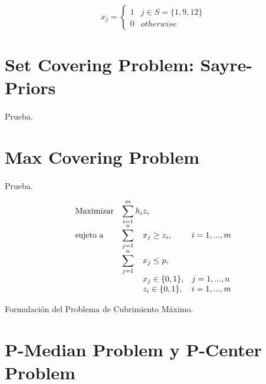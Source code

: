 \documentclass[spanish]{article}
\begin{document}
			\begin{equation}
			\label{eq:sol-2.2}
				x_{j} =
					\begin{cases}
		      	1 & j \in S = \{ 1, 9, 12  \} \\
		      	0 & otherwise
			   	\end{cases}
			\end{equation}


	\section{Set Covering Problem: Sayre-Priors}
	\label{sec:3}

		\paragraph{}
		Prueba.



	\section{Max Covering Problem}
	\label{sec:4}

		\paragraph{}
		Prueba.

		\begin{eqfloat}
			\begin{equation}
				\begin{array}{ll@{}ll}
					\text{Maximizar}
						& \displaystyle\sum\limits_{i = 1}^{m} h_{i} & z_{i} 			&							\\
					\text{sujeto a}
						& \displaystyle\sum\limits_{j = 1}^n 	& x_{j} \geq z_i,		&i=1 ,..., m	\\
						& \displaystyle\sum\limits_{j = 1}^n 	& x_{j} \leq p,  		& 						\\
						&                                     &	x_{j} \in \{0,1\},&j=1 ,..., n 	\\
						&                                     &	z_{i} \in \{0,1\},&i=1 ,..., m  \\
				\end{array}
			\end{equation}
			\caption{Formulación del Problema de Cubrimiento Máximo.}
      \label{eq:max_covering}
    \end{eqfloat}


	\section{P-Median Problem y P-Center Problem}
	\label{sec:5}
\end{document}
